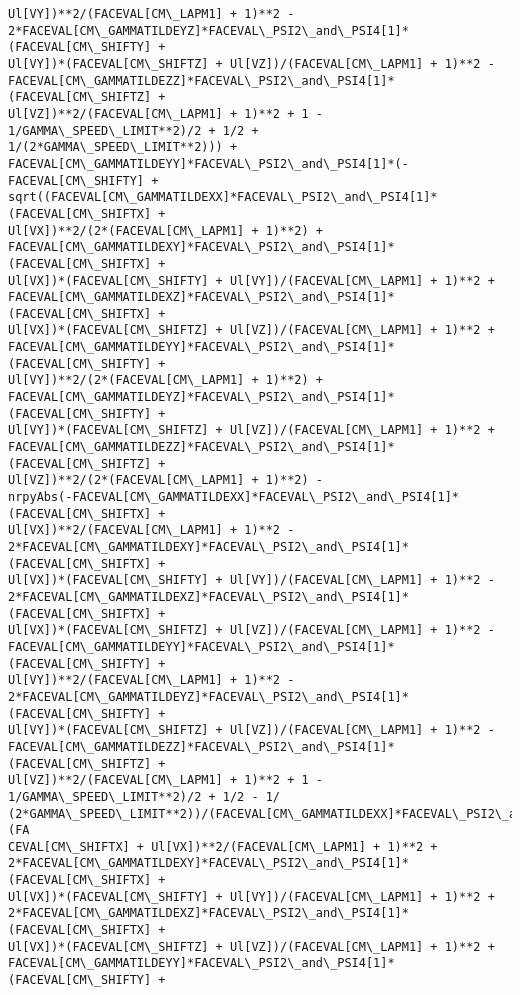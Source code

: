 \documentclass[landscape,letterpaper,10pt,english]{article}
\begin{document}
\begin{Verbatim}[commandchars=\\\{\}]
Ul[VY])**2/(FACEVAL[CM\_LAPM1] + 1)**2 -
2*FACEVAL[CM\_GAMMATILDEYZ]*FACEVAL\_PSI2\_and\_PSI4[1]*(FACEVAL[CM\_SHIFTY] +
Ul[VY])*(FACEVAL[CM\_SHIFTZ] + Ul[VZ])/(FACEVAL[CM\_LAPM1] + 1)**2 -
FACEVAL[CM\_GAMMATILDEZZ]*FACEVAL\_PSI2\_and\_PSI4[1]*(FACEVAL[CM\_SHIFTZ] +
Ul[VZ])**2/(FACEVAL[CM\_LAPM1] + 1)**2 + 1 - 1/GAMMA\_SPEED\_LIMIT**2)/2 + 1/2 +
1/(2*GAMMA\_SPEED\_LIMIT**2))) +
FACEVAL[CM\_GAMMATILDEYY]*FACEVAL\_PSI2\_and\_PSI4[1]*(-FACEVAL[CM\_SHIFTY] +
sqrt((FACEVAL[CM\_GAMMATILDEXX]*FACEVAL\_PSI2\_and\_PSI4[1]*(FACEVAL[CM\_SHIFTX] +
Ul[VX])**2/(2*(FACEVAL[CM\_LAPM1] + 1)**2) +
FACEVAL[CM\_GAMMATILDEXY]*FACEVAL\_PSI2\_and\_PSI4[1]*(FACEVAL[CM\_SHIFTX] +
Ul[VX])*(FACEVAL[CM\_SHIFTY] + Ul[VY])/(FACEVAL[CM\_LAPM1] + 1)**2 +
FACEVAL[CM\_GAMMATILDEXZ]*FACEVAL\_PSI2\_and\_PSI4[1]*(FACEVAL[CM\_SHIFTX] +
Ul[VX])*(FACEVAL[CM\_SHIFTZ] + Ul[VZ])/(FACEVAL[CM\_LAPM1] + 1)**2 +
FACEVAL[CM\_GAMMATILDEYY]*FACEVAL\_PSI2\_and\_PSI4[1]*(FACEVAL[CM\_SHIFTY] +
Ul[VY])**2/(2*(FACEVAL[CM\_LAPM1] + 1)**2) +
FACEVAL[CM\_GAMMATILDEYZ]*FACEVAL\_PSI2\_and\_PSI4[1]*(FACEVAL[CM\_SHIFTY] +
Ul[VY])*(FACEVAL[CM\_SHIFTZ] + Ul[VZ])/(FACEVAL[CM\_LAPM1] + 1)**2 +
FACEVAL[CM\_GAMMATILDEZZ]*FACEVAL\_PSI2\_and\_PSI4[1]*(FACEVAL[CM\_SHIFTZ] +
Ul[VZ])**2/(2*(FACEVAL[CM\_LAPM1] + 1)**2) -
nrpyAbs(-FACEVAL[CM\_GAMMATILDEXX]*FACEVAL\_PSI2\_and\_PSI4[1]*(FACEVAL[CM\_SHIFTX] +
Ul[VX])**2/(FACEVAL[CM\_LAPM1] + 1)**2 -
2*FACEVAL[CM\_GAMMATILDEXY]*FACEVAL\_PSI2\_and\_PSI4[1]*(FACEVAL[CM\_SHIFTX] +
Ul[VX])*(FACEVAL[CM\_SHIFTY] + Ul[VY])/(FACEVAL[CM\_LAPM1] + 1)**2 -
2*FACEVAL[CM\_GAMMATILDEXZ]*FACEVAL\_PSI2\_and\_PSI4[1]*(FACEVAL[CM\_SHIFTX] +
Ul[VX])*(FACEVAL[CM\_SHIFTZ] + Ul[VZ])/(FACEVAL[CM\_LAPM1] + 1)**2 -
FACEVAL[CM\_GAMMATILDEYY]*FACEVAL\_PSI2\_and\_PSI4[1]*(FACEVAL[CM\_SHIFTY] +
Ul[VY])**2/(FACEVAL[CM\_LAPM1] + 1)**2 -
2*FACEVAL[CM\_GAMMATILDEYZ]*FACEVAL\_PSI2\_and\_PSI4[1]*(FACEVAL[CM\_SHIFTY] +
Ul[VY])*(FACEVAL[CM\_SHIFTZ] + Ul[VZ])/(FACEVAL[CM\_LAPM1] + 1)**2 -
FACEVAL[CM\_GAMMATILDEZZ]*FACEVAL\_PSI2\_and\_PSI4[1]*(FACEVAL[CM\_SHIFTZ] +
Ul[VZ])**2/(FACEVAL[CM\_LAPM1] + 1)**2 + 1 - 1/GAMMA\_SPEED\_LIMIT**2)/2 + 1/2 - 1/
(2*GAMMA\_SPEED\_LIMIT**2))/(FACEVAL[CM\_GAMMATILDEXX]*FACEVAL\_PSI2\_and\_PSI4[1]*(FA
CEVAL[CM\_SHIFTX] + Ul[VX])**2/(FACEVAL[CM\_LAPM1] + 1)**2 +
2*FACEVAL[CM\_GAMMATILDEXY]*FACEVAL\_PSI2\_and\_PSI4[1]*(FACEVAL[CM\_SHIFTX] +
Ul[VX])*(FACEVAL[CM\_SHIFTY] + Ul[VY])/(FACEVAL[CM\_LAPM1] + 1)**2 +
2*FACEVAL[CM\_GAMMATILDEXZ]*FACEVAL\_PSI2\_and\_PSI4[1]*(FACEVAL[CM\_SHIFTX] +
Ul[VX])*(FACEVAL[CM\_SHIFTZ] + Ul[VZ])/(FACEVAL[CM\_LAPM1] + 1)**2 +
FACEVAL[CM\_GAMMATILDEYY]*FACEVAL\_PSI2\_and\_PSI4[1]*(FACEVAL[CM\_SHIFTY] +

\end{Verbatim}
\end{document}
